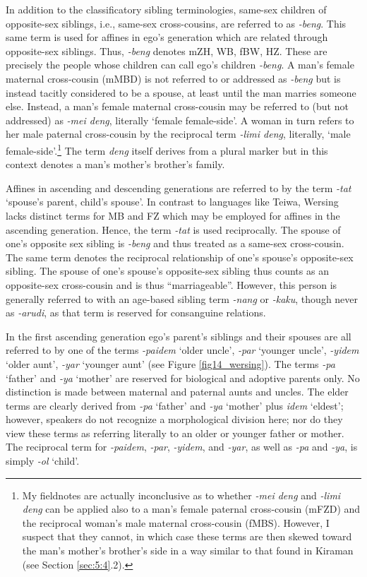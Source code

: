 In addition to the classificatory sibling terminologies, same-sex children of opposite-sex siblings, i.e., same-sex cross-cousins, are referred to as \textit{-beng}. This same term is used for affines in ego's generation which are related through opposite-sex siblings. Thus, \textit{-beng} denotes mZH, WB, fBW, HZ. These are precisely the people whose children can call ego's children \textit{-beng}. A man's female maternal cross-cousin (mMBD) is not referred to or addressed as \textit{-beng} but is instead tacitly considered to be a spouse, at least until the man marries someone else. Instead, a man's female maternal cross-cousin may be referred to (but not addressed) as \textit{-mei deng}, literally `female female-side'. A woman in turn refers to her male paternal cross-cousin by the reciprocal term \textit{-limi deng}, literally, `male female-side'.\footnote{{ }  My fieldnotes are actually inconclusive as to whether \textit{-mei deng} and \textit{-limi deng} can be applied also to a man's female paternal cross-cousin (mFZD) and the reciprocal woman's male maternal cross-cousin (fMBS). However, I suspect that they cannot, in which case these terms are then skewed toward the man's mother's brother's side in a way similar to that found in Kiraman (see Section \ref{sec:5:4}.2).}  The term \textit{deng} itself derives from a plural marker but in this context denotes a man's mother's brother's family.

Affines in ascending and descending generations are referred to by the term \textit{-tat} `spouse's parent, child's spouse'. In contrast to languages like Teiwa, Wersing lacks distinct terms for MB and FZ which may be employed for affines in the ascending generation. Hence, the term \textit{-tat} is used reciprocally. The spouse of one's opposite sex sibling is \textit{{}-beng} and thus treated as a same-sex cross-cousin. The same term denotes the reciprocal relationship of one's spouse's opposite-sex sibling. The spouse of one's spouse's opposite-sex sibling thus counts as an opposite-sex cross-cousin and is thus ``marriageable''. However, this person is generally referred to with an age-based sibling term \textit{{}-nang} or \textit{{}-kaku}, though never as \textit{{}-arudi}, as that term is reserved for consanguine relations. 

In the first ascending generation ego's parent's siblings and their spouses are all referred to by one of the terms \textit{-paidem} `older uncle', \textit{-par} `younger uncle', \textit{-yidem} `older aunt', \textit{-yar} `younger aunt' (see Figure \ref{fig14_wersing}). The terms \textit{-pa} `father' and \textit{-ya} `mother' are reserved for biological and adoptive parents only. No distinction is made between maternal and paternal aunts and uncles. The elder terms are clearly derived from \textit{-pa} `father' and \textit{-ya} `mother' plus \textit{idem} `eldest'; however, speakers do not recognize a morphological division here; nor do they view these terms as referring literally to an older or younger father or mother. The reciprocal term for \textit{{}-paidem}, \textit{{}-par}, \textit{{}-yidem}, and \textit{{}-yar}, as well as \textit{-pa} and \textit{{}-ya}, is simply \textit{{}-ol} `child'. 


